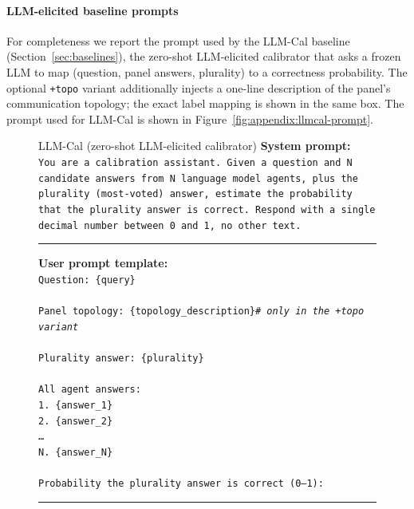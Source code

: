 \paragraph{LLM-elicited baseline prompts}
For completeness we report the prompt used by the LLM-Cal baseline
(Section~\ref{sec:baselines}), the zero-shot LLM-elicited calibrator that
asks a frozen LLM to map (question, panel answers, plurality) to a
correctness probability. The optional \texttt{+topo} variant
additionally injects a one-line description of the panel's
communication topology; the exact label mapping is shown in the same
box.  The prompt used for LLM-Cal is shown in Figure~\ref{fig:appendix:llmcal-prompt}.
\begin{figure}[t]
\centering
\small

\begin{promptbox2}{LLM-Cal (zero-shot LLM-elicited calibrator)}
\textbf{System prompt:}\\[2pt]
\texttt{You are a calibration assistant. Given a question and N
candidate answers from N language model agents, plus the plurality
(most-voted) answer, estimate the probability that the plurality
answer is correct. Respond with a single decimal number between 0
and 1, no other text.}

\vspace{6pt}\hrule\vspace{4pt}

\textbf{User prompt template:}\\[2pt]
\texttt{Question: \{query\}\\
\\
Panel topology: \{topology\_description\}\;\textit{\#\ only in the
+topo variant}\\
\\
Plurality answer: \{plurality\}\\
\\
All agent answers:\\
\hphantom{xx}1. \{answer\_1\}\\
\hphantom{xx}2. \{answer\_2\}\\
\hphantom{xx}\ldots\\
\hphantom{xx}N. \{answer\_N\}\\
\\
Probability the plurality answer is correct (0--1):}

\vspace{6pt}\hrule\vspace{4pt}


\end{promptbox2}
\end{figure}
